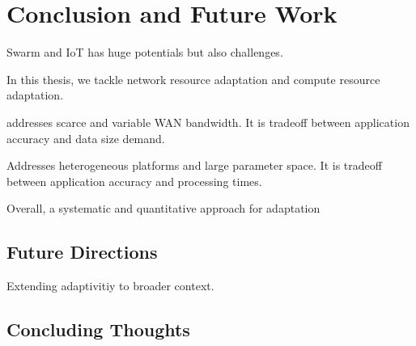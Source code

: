 \documentclass[thesis.tex]{subfiles}
\begin{document}
\chapter{Conclusion and Future Work}
\label{cha:concl-future-work}

Swarm and IoT has huge potentials but also challenges.

In this thesis, we tackle network resource adaptation and compute resource
adaptation.

 \sysname{} addresses scarce and variable WAN
bandwidth. It is tradeoff between application accuracy and data size demand.

 Addresses heterogeneous platforms and large
parameter space. It is tradeoff between application accuracy and processing
times.

Overall, a systematic and quantitative approach for adaptation

\section{Future Directions}
\label{sec:future-directions}

Extending adaptivitiy to broader context.

\section{Concluding Thoughts}
\label{sec:concluding-thoughts}
\end{document}
